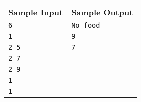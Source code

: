 \documentclass{article}
\begin{document}
\begin{tabular}{l|l}
    \hline
    \hline
    Sample Input & Sample Output \\
    \hline
    \verb+6+ & \verb+No food+ \\
    \verb+1+ & \verb+9+ \\
    \verb+2 5+ & \verb+7+ \\
    \verb+2 7+ & \verb++ \\
    \verb+2 9+ & \verb++ \\
    \verb+1+ & \verb++ \\
    \verb+1+ & \verb++ \\
    \hline
\end{tabular}
\end{document}
